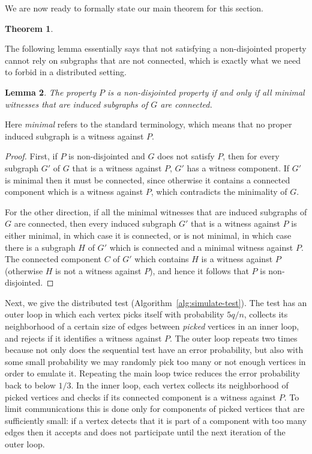 \documentclass[11pt]{article}
\newtheorem{theorem}{Theorem}[section]
\newtheorem{lemma}[theorem]{Lemma}
\begin{document}
We are now ready to formally state our main theorem for this section.

\begin{theorem}
\label{thm:sim}
\ThmSim
\end{theorem}


The following lemma essentially says that not satisfying a non-disjointed property cannot rely on subgraphs that are not connected, which is exactly what we need to forbid in a distributed setting.
\begin{lemma}
\label{lem:dist-prop-min}
The property $P$ is a non-disjointed property if and only if all minimal
witnesses that are induced subgraphs of $G$ are connected.
\end{lemma}
Here \emph{minimal} refers to the standard terminology, which means that no proper induced subgraph is a witness against $P$.

\begin{proof}
First, if $P$ is non-disjointed and $G$ does not satisfy $P$, then for
every subgraph $G'$ of $G$ that is a witness against $P$, $G'$ has a
witness component. If $G'$ is minimal then it must be
connected, since otherwise it contains a connected component which is a
witness against $P$, which contradicts the minimality of $G$.

For the other direction, if all the minimal witnesses that are induced
subgraphs of $G$ are connected, then every induced subgraph $G'$ that is a
witness against $P$ is either minimal, in which case it is connected, or is
not minimal, in which case there is a subgraph $H$ of $G'$ which is
connected and a minimal witness against $P$. The connected component $C$ of
$G'$ which contains $H$ is a witness against $P$ (otherwise $H$ is not a
witness against $P$), and hence it follows that $P$ is non-disjointed.
\end{proof}


Next, we give the distributed test (Algorithm~\ref{alg:simulate-test}). The test has an outer loop
in which each vertex picks itself with probability $5q/n$, collects its neighborhood of a certain
size of edges between \emph{picked} vertices in an inner loop, and rejects if it identifies a
witness against $P$. The outer loop repeats two times because not only does the sequential test have
an error probability, but also with some small probability we may randomly pick too many or not
enough vertices in order to emulate it. Repeating the main loop twice reduces the error probability
back to below $1/3$. In the inner loop, each vertex collects its neighborhood of picked vertices and
checks if its connected component is a witness against $P$. To limit communications this is done
only for components of picked vertices that are sufficiently small: if a vertex detects that it is
part of a component with too many edges then it accepts and does not participate until the next
iteration of the outer loop.
\end{document}

